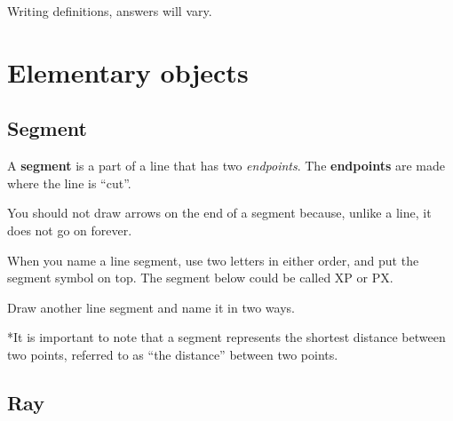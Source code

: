 \begin{exercises}
\begin{ex}
\begin{exparts}
\begin{tikzpicture}
	\end{tikzpicture}
	\end{exparts}
		
	\begin{sol}
	Writing definitions, answers will vary.  
	\end{sol}
	\end{ex}

	
\end{exercises}

			\section{Elementary objects}

\subsection{Segment}

A \textbf{segment} is a part of a line that has two \emph{endpoints}.  The \textbf{endpoints} are made where the line is ``cut''.

You should not draw arrows on the end of a segment because, unlike a line, it does not go on forever.

When you name a line segment, use two letters in either order, and put the segment symbol on top.  The segment below could be called \seg XP or \seg PX. 

	\begin{center}
	\end{center}
	
\q Draw another line segment and name it in two ways.	

\smallskip

\noindent **It is important to note that a segment represents the shortest distance between two points, referred to as ``the distance'' between two points.

\subsection{Ray}

